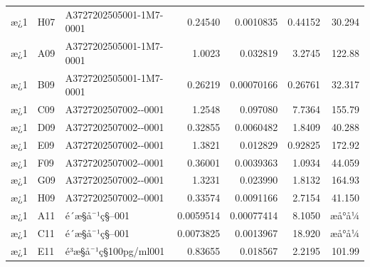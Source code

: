 \documentclass[UTF8,10pt,a4paper,fontset=fandol]{ctexart}
\begin{document}
\begin{tabularx}{\textwidth}{@{}llXrrrr@{}}
æ¿1 & H07 & A3727202505001-\newline 1M7-0001 & 0.24540 & 0.0010835 & 0.44152 & 30.294 \\
æ¿1 & A09 & A3727202505001-\newline 1M7-0001 & 1.0023 & 0.032819 & 3.2745 & 122.88 \\
æ¿1 & B09 & A3727202505001-\newline 1M7-0001 & 0.26219 & 0.00070166 & 0.26761 & 32.317 \\
æ¿1 & C09 & A3727202507002-\newline 1-0001 & 1.2548 & 0.097080 & 7.7364 & 155.79 \\
æ¿1 & D09 & A3727202507002-\newline 1-0001 & 0.32855 & 0.0060482 & 1.8409 & 40.288 \\
æ¿1 & E09 & A3727202507002-\newline 2-0001 & 1.3821 & 0.012829 & 0.92825 & 172.92 \\
æ¿1 & F09 & A3727202507002-\newline 2-0001 & 0.36001 & 0.0039363 & 1.0934 & 44.059 \\
æ¿1 & G09 & A3727202507002-\newline 3-0001 & 1.3231 & 0.023990 & 1.8132 & 164.93 \\
æ¿1 & H09 & A3727202507002-\newline 3-0001 & 0.33574 & 0.0091166 & 2.7154 & 41.150 \\
æ¿1 & A11 & é´æ§å¯¹ç§--001 & 0.0059514 & 0.00077414 & 8.1050 & æå°å¼ \\
æ¿1 & C11 & é´æ§å¯¹ç§--001 & 0.0073825 & 0.0013967 & 18.920 & æå°å¼ \\
æ¿1 & E11 & é³æ§å¯¹ç§100pg/ml001 & 0.83655 & 0.018567 & 2.2195 & 101.99 \\
\end{tabularx}

\vspace{1em}
\end{document}
